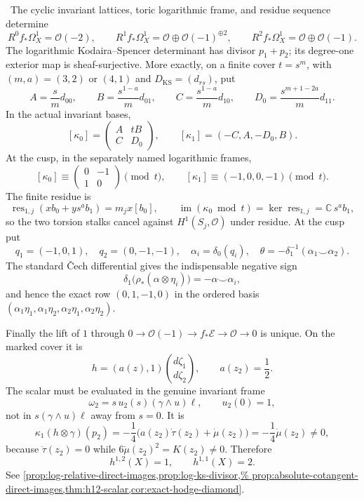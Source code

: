 \begin{auditrecord}
\Verified\ The cyclic invariant lattices, toric logarithmic frame, and
residue sequence determine
\[
 R^0f_*\Omega_X^1=\mathcal O(-2),\qquad
 R^1f_*\Omega_X^1=\mathcal O\oplus\mathcal O(-1)^{\oplus2},\qquad
 R^2f_*\Omega_X^1=\mathcal O\oplus\mathcal O(-1).
\]
The logarithmic Kodaira--Spencer determinant has divisor $p_1+p_2$; its
degree-one exterior map is sheaf-surjective.  More exactly, on a finite
cover $t=s^m$, with $(m,a)=(3,2)$ or $(4,1)$ and
$D_{\mathrm{KS}}=(d_{rs})$, put
\[
 A=\frac{s}{m}d_{00},\qquad B=\frac{s^{1-a}}m d_{01},\qquad
 C=\frac{s^{1-a}}m d_{10},\qquad
 D_0=\frac{s^{m+1-2a}}m d_{11}.
\]
In the actual invariant bases,
\[
 [\kappa_0]=\begin{pmatrix}A&tB\\C&D_0\end{pmatrix},
 \qquad [\kappa_1]=(-C,A,-D_0,B).
\]
At the cusp, in the separately named logarithmic frames,
\[
 [\kappa_0]\equiv\begin{pmatrix}0&-1\\1&0\end{pmatrix}\pmod t,
 \qquad [\kappa_1]\equiv(-1,0,0,-1)\pmod t.
\]
The finite residue is
\[
 \operatorname{res}_{1,j}(xb_0+ys^ab_1)=m_jx[b_0],\qquad
 \operatorname{im}(\kappa_0\bmod t)
 =\ker\operatorname{res}_{1,j}=\mathbb C\,s^ab_1,
\]
so the two torsion stalks cancel against
$H^1(S_j,\mathcal O)$ under residue.  At the cusp put
\[
 q_1=(-1,0,1),\quad q_2=(0,-1,-1),\quad
 \alpha_i=\delta_0(q_i),\quad
 \theta=-\delta_1^{-1}(\alpha_1\smile\alpha_2).
\]
The standard \v Cech differential gives the indispensable negative sign
\[
 \delta_1\bigl(\rho_*(\alpha\otimes\eta_i)\bigr)
 =-\alpha\smile\alpha_i,
\]
and hence the exact row $(0,1,-1,0)$ in the ordered basis
$(\alpha_1\eta_1,\alpha_1\eta_2,\alpha_2\eta_1,\alpha_2\eta_2)$.

Finally the lift of $1$ through
$0\to\mathcal O(-1)\to f_*\mathcal E\to\mathcal O\to0$ is unique.
On the marked cover it is
\[
 h=(a(z),1)\binom{d\zeta_1}{d\zeta_2},\qquad a(z_2)=\frac12.
\]
The scalar must be evaluated in the genuine invariant frame
\[
 \omega_2=s\,u_2(s)(\gamma\wedge u)\ell,\qquad u_2(0)=1,
\]
not in $s(\gamma\wedge u)\ell$ away from $s=0$.  It is
\[
 \kappa_1(h\otimes\gamma)(p_2)
 =-\frac14\bigl(a(z_2)\dot\tau(z_2)+\dot\mu(z_2)\bigr)
 =-\frac14\dot\mu(z_2)\ne0,
\]
because $\dot\tau(z_2)=0$ while
$6\dot\mu(z_2)^2=K(z_2)\ne0$.  Therefore
\[
 h^{1,2}(X)=1,\qquad h^{1,1}(X)=2.
\]
See
\cref{prop:log-relative-direct-images,prop:log-ks-divisor,%
prop:absolute-cotangent-direct-images,thm:h12-scalar,cor:exact-hodge-diamond}.
\end{auditrecord}

